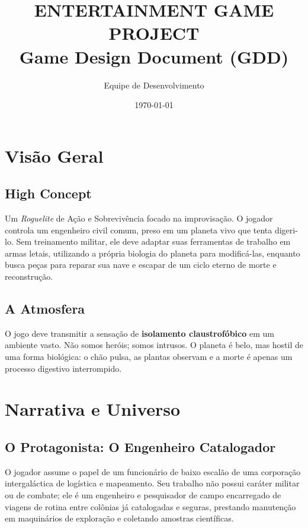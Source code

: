 \documentclass[a4paper,12pt]{report}
\title{\textbf{ENTERTAINMENT GAME PROJECT}\\ \large Game Design Document (GDD)}
\author{Equipe de Desenvolvimento}
\date{\today}
\begin{document}
\maketitle
\tableofcontents

\chapter{Visão Geral}

\section{High Concept}
Um \textit{Roguelite} de Ação e Sobrevivência focado na improvisação. O jogador controla um engenheiro civil comum, preso em um planeta vivo que tenta digeri-lo. Sem treinamento militar, ele deve adaptar suas ferramentas de trabalho em armas letais, utilizando a própria biologia do planeta para modificá-las, enquanto busca peças para reparar sua nave e escapar de um ciclo eterno de morte e reconstrução.

\section{A Atmosfera}
O jogo deve transmitir a sensação de \textbf{isolamento claustrofóbico} em um ambiente vasto. Não somos heróis; somos intrusos. O planeta é belo, mas hostil de uma forma biológica: o chão pulsa, as plantas observam e a morte é apenas um processo digestivo interrompido.

\chapter{Narrativa e Universo}

\section{O Protagonista: O Engenheiro Catalogador}
O jogador assume o papel de um funcionário de baixo escalão de uma corporação intergaláctica de logística e mapeamento. Seu trabalho não possui caráter militar ou de combate; ele é um engenheiro e pesquisador de campo encarregado de viagens de rotina entre colônias já catalogadas e seguras, prestando manutenção em maquinários de exploração e coletando amostras científicas.
\end{document}
